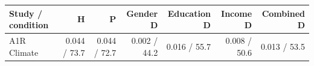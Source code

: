 
\begin{tabular}{lrrrrrr}
\toprule
Study / condition & H & P & Gender D & Education D & Income D & Combined D\\
\midrule
A1R Climate & 0.044 / 73.7 & 0.044 / 72.7 & 0.002 / 44.2 & 0.016 / 55.7 & 0.008 / 50.6 & 0.013 / 53.5\\
\bottomrule
\end{tabular}
